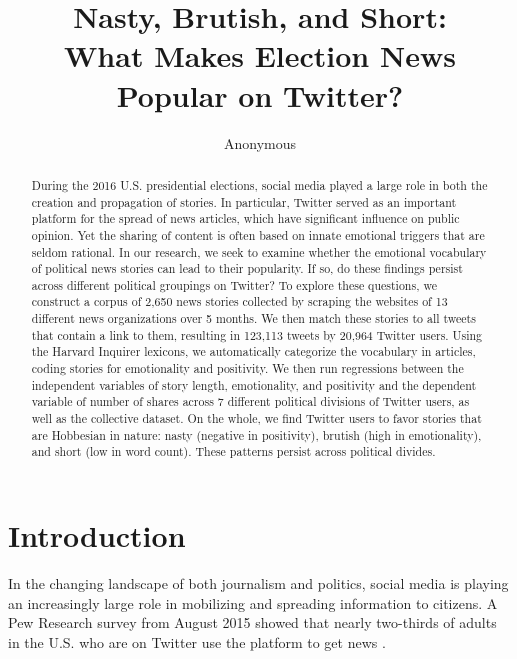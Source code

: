 \documentclass[letterpaper]{article}
\begin{document}
%
\title{Nasty, Brutish, and Short:\\
What Makes Election News Popular on Twitter?}
\author{Anonymous\\
}
\maketitle
\begin{abstract}

During the 2016 U.S. presidential elections, social media played a large role in both the creation and propagation of stories. In particular, Twitter served as an important platform for the spread of news articles, which have significant influence on public opinion. Yet the sharing of content is often based on innate emotional triggers that are seldom rational. In our research, we seek to examine whether the emotional vocabulary of political news stories can lead to their popularity. If so, do these findings persist across different political groupings on Twitter? To explore these questions, we construct a corpus of 2,650 news stories collected by scraping the websites of 13 different news organizations over 5 months. We then match these stories to all tweets that contain a link to them, resulting in 123,113 tweets by 20,964 Twitter users. Using the Harvard Inquirer lexicons, we automatically categorize the vocabulary in articles, coding stories for emotionality and positivity. We then run regressions between the independent variables of story length, emotionality, and positivity and the dependent variable of number of shares across 7 different political divisions of Twitter users, as well as the collective dataset. On the whole, we find Twitter users to favor stories that are Hobbesian in nature: nasty (negative in positivity), brutish (high in emotionality), and short (low in word count). These patterns persist across political divides.

\end{abstract}

 
\section{Introduction}
In the changing landscape of both journalism and politics, social media is playing an increasingly large role in mobilizing and spreading information to citizens. A Pew Research survey from August 2015 showed that nearly two-thirds of adults in the U.S. who are on Twitter use the platform to get news \cite{pew-Twitter-news}. 
\end{document}
